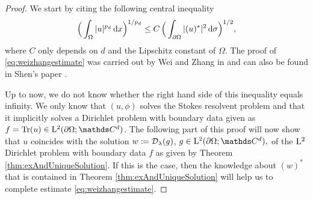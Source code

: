 \begin{proof}
  We start by citing the following central inequality
  \begin{align}
    \label{eq:weizhangestimate}
    \Big( \int_\Omega |u|^{p_d} \, {\operatorname{d}\!{x}} \Big)^{1/{p_d}} \leq C\, \Big( \int_{\partial\Omega} |(u)^*|^2 \, {\operatorname{d}\!{\sigma}} \Big)^{1/2},
  \end{align}
  where $C$ only depends on $d$ and the Lipschitz constant of $\Omega$.
  The proof of \eqref{eq:weizhangestimate} was carried out by Wei and Zhang in \cite[Lem. 3.3]{weiZhang} and can also be found in Shen's paper \cite[p. 418f.]{Shen2012}.

  Up to now, we do not know whether the right hand side of this inequality equals infinity.
  We only know that $(u,\phi)$ solves the Stokes resolvent problem and that it implicitly solves a Dirichlet problem with boundary data given as $f = \operatorname{Tr} (u) \in \Ell^2(\partial\Omega; \C^d)$.
  The following part of this proof will now show that $u$ coincides with the solution $w \coloneqq \mathcal{D}_\lambda(g)$, $g \in \Ell^2(\partial\Omega; \C^d),$  of the $\mathrm{L}^2$ Dirichlet problem with boundary data $f$ as given by Theorem \ref{thm:exAndUniqueSolution}. 
  If this is the case, then the knowledge about $(w)^*$ that is contained in Theorem \ref{thm:exAndUniqueSolution} will help us to complete estimate \eqref{eq:weizhangestimate}.


\end{proof}
